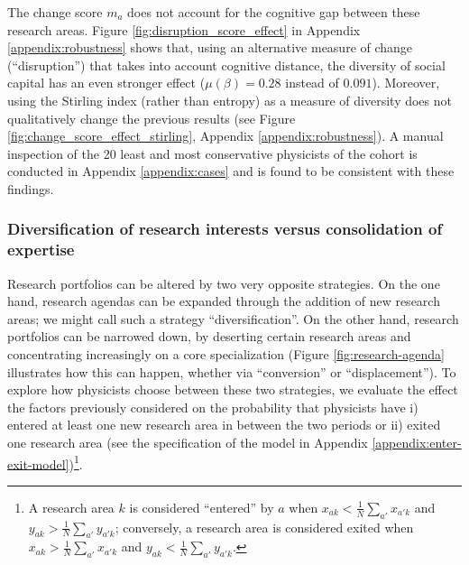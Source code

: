\documentclass{article}
\begin{document}
The change score $m_a$ does not account for the cognitive gap between these research areas. Figure \ref{fig:disruption_score_effect} in Appendix \ref{appendix:robustness} shows that, using an alternative measure of change (``disruption'') that takes into account cognitive distance, the diversity of social capital has an even stronger effect ($\mu(\beta)=0.28$ instead of $0.091$). Moreover, using the Stirling index (rather than entropy) as a measure of diversity does not qualitatively change the previous results (see Figure \ref{fig:change_score_effect_stirling}, Appendix \ref{appendix:robustness}). A manual inspection of the 20 least and most conservative physicists of the cohort is conducted in Appendix \ref{appendix:cases} and is found to be consistent with these findings.

\subsubsection{Diversification of research interests versus consolidation of expertise}

Research portfolios can be altered by two very opposite strategies. On the one hand, research agendas can be expanded through the addition of new research areas; we might call such a strategy ``diversification''. On the other hand, research portfolios can be narrowed down, by deserting certain research areas and concentrating increasingly on a core specialization (Figure \ref{fig:research-agenda} illustrates how this can happen, whether via ``conversion'' or ``displacement''). To explore how physicists choose between these two strategies, we evaluate the effect the factors previously considered on the probability that physicists have i) entered at least one new research area in between the two periods or ii) exited one research area (see the specification of the model in Appendix \ref{appendix:enter-exit-model})\footnote{A research area $k$ is considered ``entered'' by $a$ when $x_{ak}<\frac{1}{N}\sum_{a'}x_{a'k}$ and $y_{ak}>\frac{1}{N}\sum_{a'}y_{a'k}$; conversely, a research area is considered exited when $x_{ak}>\frac{1}{N}\sum_{a'}x_{a'k}$ and $y_{ak}<\frac{1}{N}\sum_{a'}y_{a'k}$.}.

\end{document}
